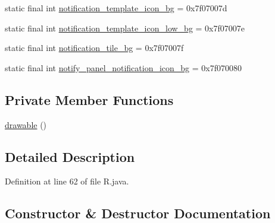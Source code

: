 \begin{DoxyCompactItemize}
\item 
static final int \mbox{\hyperlink{classandroid_1_1support_1_1graphics_1_1drawable_1_1_r_1_1drawable_a3a1f9adebded4090513d2adfad776b00}{notification\+\_\+template\+\_\+icon\+\_\+bg}} = 0x7f07007d
\item 
static final int \mbox{\hyperlink{classandroid_1_1support_1_1graphics_1_1drawable_1_1_r_1_1drawable_aa043c18192131873dfb9e8726226b99a}{notification\+\_\+template\+\_\+icon\+\_\+low\+\_\+bg}} = 0x7f07007e
\item 
static final int \mbox{\hyperlink{classandroid_1_1support_1_1graphics_1_1drawable_1_1_r_1_1drawable_ad7bb393526fbabc1f476d1ba3e4c8e32}{notification\+\_\+tile\+\_\+bg}} = 0x7f07007f
\item 
static final int \mbox{\hyperlink{classandroid_1_1support_1_1graphics_1_1drawable_1_1_r_1_1drawable_a68192417427687e55d351e38d84bb5d4}{notify\+\_\+panel\+\_\+notification\+\_\+icon\+\_\+bg}} = 0x7f070080
\end{DoxyCompactItemize}
\subsection*{Private Member Functions}
\begin{DoxyCompactItemize}
\item 
\mbox{\hyperlink{classandroid_1_1support_1_1graphics_1_1drawable_1_1_r_1_1drawable_a54402ab6fc9a530f19c65c3da43997b0}{drawable}} ()
\end{DoxyCompactItemize}


\subsection{Detailed Description}


Definition at line 62 of file R.\+java.



\subsection{Constructor \& Destructor Documentation}
\mbox{\label{classandroid_1_1support_1_1graphics_1_1drawable_1_1_r_1_1drawable_a54402ab6fc9a530f19c65c3da43997b0}} 
